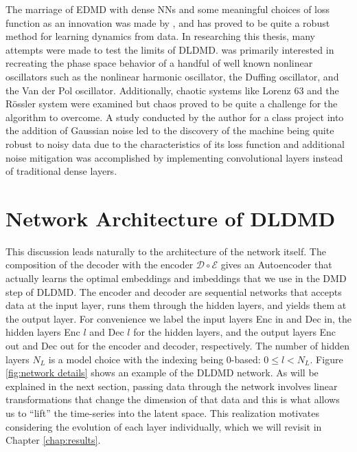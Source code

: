 The marriage of EDMD with dense NNs and some meaningful choices of loss function as 
an innovation was made by \cite{lago, brunton, lusch}, and has proved to be quite a 
robust method for learning dynamics from data. In researching this thesis, many attempts 
were made to test the limits of DLDMD. \cite{lago} was primarily interested in recreating 
the phase space behavior of a handful of well known nonlinear oscillators such as the 
nonlinear harmonic oscillator, the Duffing oscillator, and the Van der Pol oscillator. 
Additionally, chaotic systems like Lorenz 63 and the R\"{o}ssler system were examined but 
chaos proved to be quite a challenge for the algorithm to overcome. A study conducted by the
author for a class project into the addition
of Gaussian noise led to the discovery of the machine being quite robust to noisy data due to the 
characteristics of its loss function and additional noise mitigation was accomplished by 
implementing convolutional layers instead of traditional dense layers.

\section{Network Architecture of DLDMD}
This discussion leads naturally to the architecture of the network itself. The composition
of the decoder with the encoder $\mathcal{D} \circ \mathcal{E}$ gives an Autoencoder \cite{kramer}
that actually learns the optimal embeddings and imbeddings that we use in the DMD step of DLDMD.
The encoder and decoder are sequential networks that accepts data at the input layer, runs them 
through the hidden layers, and yields them at the output layer. For convenience we label the input
layers Enc in and Dec in, the hidden layers Enc $l$ and Dec $l$ for the hidden layers, and the 
output layers Enc out and Dec out for the encoder and decoder, respectively. The number of hidden 
layers $N_L$ is a model choice with the indexing being 0-based: $0 \leq l < N_L$. Figure 
\ref{fig:network details} shows an example of the DLDMD network. As will be explained in the next
section, passing data through the network involves linear transformations that change the dimension
of that data and this is what allows us to ``lift'' the time-series into the latent space. This 
realization motivates considering the evolution of each layer individually, which we will revisit in 
Chapter \ref{chap:results}.

